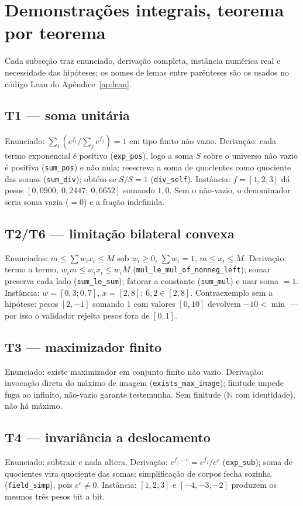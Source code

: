 \section{Demonstrações integrais, teorema por teorema}
Cada subseção traz enunciado, derivação completa, instância numérica real e necessidade das hipóteses; os nomes de lemas entre parênteses são os usados no código Lean do Apêndice~\ref{ap:lean}.
\subsection{T1 --- soma unitária}
Enunciado: $\sum_i(e^{f_i}/\sum_j e^{f_j})=1$ em tipo finito não vazio. Derivação: cada termo exponencial é positivo (\texttt{exp\_pos}), logo a soma $S$ sobre o universo não vazio é positiva (\texttt{sum\_pos}) e não nula; reescreva a soma de quocientes como quociente das somas (\texttt{sum\_div}); obtém-se $S/S=1$ (\texttt{div\_self}). Instância: $f=[1,2,3]$ dá pesos $[0{,}0900;\ 0{,}2447;\ 0{,}6652]$ somando $1{,}0$. Sem o não-vazio, o denominador seria soma vazia ($=0$) e a fração indefinida.
\subsection{T2/T6 --- limitação bilateral convexa}
Enunciados: $m\leq\sum w_ix_i\leq M$ sob $w_i\geq0$, $\sum w_i=1$, $m\leq x_i\leq M$. Derivação: termo a termo, $w_im\leq w_ix_i\leq w_iM$ (\texttt{mul\_le\_mul\_of\_nonneg\_left}); somar preserva cada lado (\texttt{sum\_le\_sum}); fatorar a constante (\texttt{sum\_mul}) e usar soma $=1$. Instância: $w=[0{,}3;0{,}7]$, $x=[2,8]$: $6{,}2\in[2,8]$. Contraexemplo sem a hipótese: pesos $[2,-1]$ somando 1 com valores $[0,10]$ devolvem $-10<\min$ --- por isso o validador rejeita pesos fora de $[0,1]$.
\subsection{T3 --- maximizador finito}
Enunciado: existe maximizador em conjunto finito não vazio. Derivação: invocação direta do máximo de imagem (\texttt{exists\_max\_image}); finitude impede fuga ao infinito, não-vazio garante testemunha. Sem finitude ($\mathbb{N}$ com identidade), não há máximo.
\subsection{T4 --- invariância a deslocamento}
Enunciado: subtrair $c$ nada altera. Derivação: $e^{f_j-c}=e^{f_j}/e^c$ (\texttt{exp\_sub}); soma de quocientes vira quociente das somas; simplificação de corpos fecha sozinha (\texttt{field\_simp}), pois $e^c\neq0$. Instância: $[1,2,3]$ e $[-4,-3,-2]$ produzem os mesmos três pesos bit a bit.
